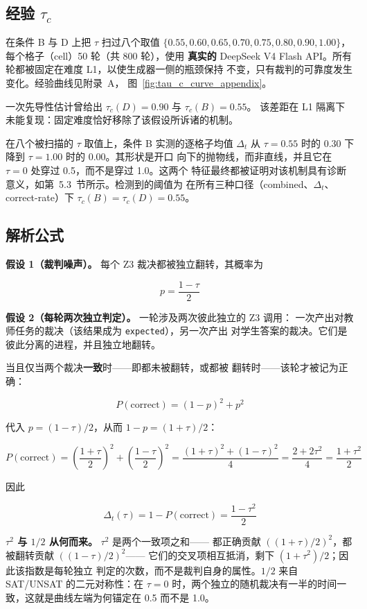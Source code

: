 \subsection{经验 $\tau_c$}
\label{sec:empirical_tau}

在条件 B 与 D 上把 $\tau$ 扫过八个取值 $\{0.55, 0.60, 0.65, 0.70, 0.75, 0.80, 0.90, 1.00\}$，
每个格子（cell）50 轮（共 800 轮），使用 \textbf{真实的} DeepSeek V4
Flash API。所有轮都被固定在难度 L1，以使生成器一侧的瓶颈保持
不变，只有裁判的可靠度发生变化。经验曲线见附录~A，
图~\ref{fig:tau_c_curve_appendix}。

一次先导性估计曾给出 $\tau_c(D) = 0.90$ 与 $\tau_c(B) = 0.55$。
该差距在 L1 隔离下未能复现：固定难度恰好移除了该假设所诉诸的机制。

在八个被扫描的 $\tau$ 取值上，条件 B 实测的逐格子均值 $\Delta_t$ 从
$\tau = 0.55$ 时的 0.30 下降到 $\tau = 1.00$ 时的 0.00。其形状是开口
向下的抛物线，而非直线，并且它在 $\tau = 0$ 处穿过 0.5，而不是穿过 1.0。这两个
特征最终都被证明对该机制具有诊断意义，如第~5.3~节所示。检测到的阈值为
在所有三种口径（combined、$\Delta_t$、correct-rate）下 $\tau_c(B) = \tau_c(D) = 0.55$。

\subsection{解析公式}
\label{sec:analytical}

\textbf{假设 1（裁判噪声）。} 每个 Z3 裁决都被独立翻转，其概率为

\[
  p = \frac{1-\tau}{2}
\]

\textbf{假设 2（每轮两次独立判定）。} 一轮涉及两次彼此独立的 Z3 调用：
一次产出对教师任务的裁决（该结果成为 \texttt{expected}），另一次产出
对学生答案的裁决。它们是彼此分离的进程，并且独立地翻转。

当且仅当两个裁决\textbf{一致}时——即都未被翻转，或都被
翻转时——该轮才被记为正确：

\[
  P(\text{correct}) = (1-p)^2 + p^2
\]

代入 $p = (1-\tau)/2$，从而 $1-p = (1+\tau)/2$：

\[
  P(\text{correct}) = \left(\frac{1+\tau}{2}\right)^2 + \left(\frac{1-\tau}{2}\right)^2
  = \frac{(1+\tau)^2 + (1-\tau)^2}{4} = \frac{2 + 2\tau^2}{4} = \frac{1+\tau^2}{2}
\]

因此

\[
  \boxed{\;\Delta_t(\tau) = 1 - P(\text{correct}) = \frac{1-\tau^2}{2}\;}
\]

\textbf{$\tau^2$ 与 $1/2$ 从何而来。} $\tau^2$ 是两个一致项之和——
都正确贡献 $((1+\tau)/2)^2$，都被翻转贡献 $((1-\tau)/2)^2$——
它们的交叉项相互抵消，剩下 $(1+\tau^2)/2$；因此该指数是每轮独立
判定的次数，而不是裁判自身的属性。$1/2$ 来自 SAT/UNSAT 的二元对称性：在
$\tau = 0$ 时，两个独立的随机裁决有一半的时间一致，这就是曲线左端为何锚定在
0.5 而不是 1.0。

